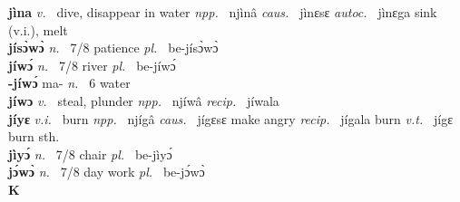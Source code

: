 {\bfseries jìna}  {\itshape v.~} dive, disappear in water   {\itshape npp.~} njìnâ {\itshape caus.~} jìnɛsɛ {\itshape autoc.~} jìnɛga sink (v.i.), melt  \\ 
{\bfseries jísɔ̀wɔ̀}  {\itshape n.~} 7/8 patience {\itshape pl.~} be-jísɔ̀wɔ̀   \\ 
{\bfseries jíwɔ́}  {\itshape n.~} 7/8 river {\itshape pl.~} be-jíwɔ́    \\ 
{\bfseries -jíwɔ́} ma- {\itshape n.~} 6 water    \\ 
{\bfseries jíwɔ}  {\itshape v.~} steal, plunder   {\itshape npp.~} njíwâ {\itshape recip.~} jíwala  \\ 
{\bfseries jíyɛ}  {\itshape v.i.~} burn  {\itshape npp.~} njígâ {\itshape caus.~} jígɛsɛ make angry {\itshape recip.~} jígala burn {\itshape v.t.~} jígɛ burn sth. \\ 
{\bfseries jìyɔ́}  {\itshape n.~} 7/8 chair {\itshape pl.~} be-jìyɔ́    \\ 
{\bfseries jɔ́wɔ̀}  {\itshape n.~} 7/8 day work {\itshape pl.~} be-jɔ́wɔ̀    \\ 

\medskip
\noindent \large {\bfseries K}\normalsize\\
\medskip

